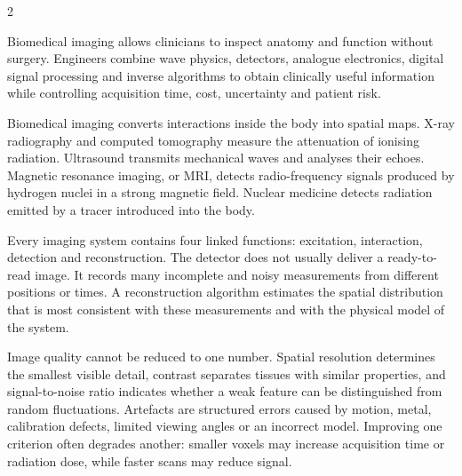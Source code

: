 

\begin{multicols}{2}
\begin{engineeringnews}
Biomedical imaging allows clinicians to inspect anatomy and function without surgery. Engineers combine wave
physics, detectors, analogue electronics, digital signal processing and inverse algorithms to obtain clinically
useful information while controlling acquisition time, cost, uncertainty and patient risk.
\end{engineeringnews}

\begin{ecarticle}
Biomedical imaging converts interactions inside the body into spatial maps. X-ray radiography and computed
tomography measure the attenuation of ionising radiation. Ultrasound transmits mechanical waves and analyses
their echoes. Magnetic resonance imaging, or MRI, detects radio-frequency signals produced by hydrogen nuclei
in a strong magnetic field. Nuclear medicine detects radiation emitted by a tracer introduced into the body.

Every imaging system contains four linked functions: excitation, interaction, detection and reconstruction.
The detector does not usually deliver a ready-to-read image. It records many incomplete and noisy measurements
from different positions or times. A reconstruction algorithm estimates the spatial distribution that is most
consistent with these measurements and with the physical model of the system.

Image quality cannot be reduced to one number. Spatial resolution determines the smallest visible detail,
contrast separates tissues with similar properties, and signal-to-noise ratio indicates whether a weak feature
can be distinguished from random fluctuations. Artefacts are structured errors caused by motion, metal,
calibration defects, limited viewing angles or an incorrect model. Improving one criterion often degrades
another: smaller voxels may increase acquisition time or radiation dose, while faster scans may reduce signal.


\end{ecarticle}
\end{multicols}
